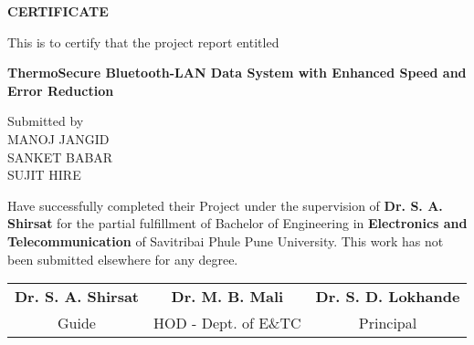 \documentclass[12pt]{report}
\newcommand{\projecttitle}{ThermoSecure Bluetooth-LAN Data System with Enhanced Speed and Error Reduction}
\begin{document}
\newpage
\thispagestyle{empty}
\centering

\textbf{\Large CERTIFICATE}\\
\vspace{1cm}

This is to certify that the project report entitled\\
\vspace{0.5cm}

\textbf{\projecttitle}\\
\vspace{1cm}

Submitted by\\
\vspace{0.5cm}
MANOJ JANGID\\
SANKET BABAR\\
SUJIT HIRE\\
\vspace{1cm}

Have successfully completed their Project under the supervision of \textbf{Dr. S. A. Shirsat} for the partial fulfillment of Bachelor of Engineering in \textbf{Electronics and Telecommunication} of Savitribai Phule Pune University. This work has not been submitted elsewhere for any degree.\\
\vspace{1.5cm}
\vfill
\begin{center}
\begin{tabular}{@{}ccc@{}}
    \textbf{Dr. S. A. Shirsat} & \textbf{Dr. M. B. Mali} & \textbf{Dr. S. D. Lokhande} \\[0.3cm]
    Guide & HOD - Dept. of E\&TC & Principal \\
\end{tabular}
\end{center}
\vspace{1cm} %

\vfill

\tableofcontents
\newpage

\listoffigures
\newpage

\listoftables
\newpage

\end{document}
